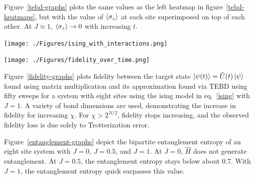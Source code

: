 \documentclass[12pt]{article}
\newenvironment{Figure}
  {\par\medskip\noindent\minipage{\linewidth}}
  {\endminipage\par\medskip}
\begin{document}
\begin{multicols}{2}
	Figure~\ref{tebd-graphs} plots the same values as the left heatmap in figure~\ref{tebd-heatmaps}, but with the value of $\braket{\sigma_z}$ at each site superimposed on top of each other. At $J\approx1$, $\braket{\sigma_z}\rightarrow 0$ with increasing $t$.

	\begin{Figure}
		\center\texttt{[image: ./Figures/ising\_with\_interactions.png]}
		\label{tebd-graphs}
	\end{Figure}

	\begin{Figure}
		\center\texttt{[image: ./Figures/fidelity\_over\_time.png]}
		\label{fidelity-graphs}
	\end{Figure}

	Figure~\ref{fidelity-graphs} plots fidelity between the target state $\ket{\psi(t)}=\hat{U}(t)\ket{\psi}$ found using matrix multiplication and its approximation found via TEBD using fifty sweeps for a system with eight sites using the ising model in eq.~\ref{ising} with $J=1$. A variety of bond dimensions are used, demonstrating the increase in fidelity for increasing $\chi$. For $\chi>2^{N/2}$, fidelity stops increasing, and the observed fidelity loss is due solely to Trotterization error.

	Figure~\ref{entanglement-graphs} depict the bipartite entanglement entropy of an eight site system with $J=0$, $J=0.5$, and $J=1$. At $J=0$, $\hat{H}$ does not generate entanglement. At $J=0.5$, the entanglement entropy stays below about 0.7. With $J=1$, the entanglement entropy quick surpasses this value.


\end{multicols}
\end{document}
